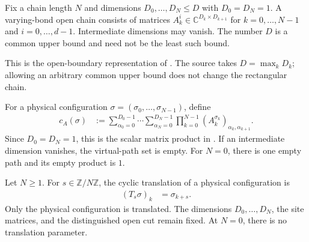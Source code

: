 \begin{definition}
    \label{def:varying_bond_obc_chain}
    \leanok
    Fix a chain length $N$ and dimensions $D_0,\ldots,D_N\leq D$ with
    $D_0=D_N=1$. A varying-bond open chain consists of matrices
    $A_k^i\in\mathbb C^{D_k\times D_{k+1}}$ for
    $k=0,\ldots,N-1$ and $i=0,\ldots,d-1$. Intermediate dimensions may
    vanish. The number $D$ is a common upper bound and need not be the least
    such bound.

    This is the open-boundary representation of
    \cite[Section~II.B]{PerezGarcia2007Matrix}. The source takes
    $D=\max_k D_k$; allowing an arbitrary common upper bound does not change
    the rectangular chain.
\end{definition}

\begin{definition}
    \label{def:varying_bond_obc_coeff}
    \leanok
    For a physical configuration
    $\sigma=(\sigma_0,\ldots,\sigma_{N-1})$, define
    \begin{align}
        c_A(\sigma)
         & :=\sum_{\alpha_0=0}^{D_0-1}\cdots
        \sum_{\alpha_N=0}^{D_N-1}
        \prod_{k=0}^{N-1}
        (A_k^{\sigma_k})_{\alpha_k,\alpha_{k+1}}.
        \label{eq:varying_bond_obc_coeff}
    \end{align}
    Since $D_0=D_N=1$, this is the scalar matrix product in
    \cite[Section~II.B]{PerezGarcia2007Matrix}. If an intermediate dimension
    vanishes, the virtual-path set is empty. For $N=0$, there is one empty
    path and its empty product is $1$.
\end{definition}

\begin{definition}
    \label{def:varying_bond_obc_translation}
    \leanok
    Let $N\geq1$. For $s\in\mathbb Z/N\mathbb Z$, the cyclic translation of
    a physical configuration is
    \begin{align}
        (T_s\sigma)_k & =\sigma_{k+s}.
        \label{eq:varying_bond_obc_translation}
    \end{align}
    Only the physical configuration is translated. The dimensions
    $D_0,\ldots,D_N$, the site matrices, and the distinguished open cut remain
    fixed. At $N=0$, there is no translation parameter.
\end{definition}

